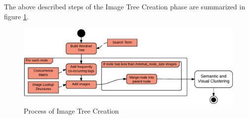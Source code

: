 The above described steps of the Image Tree Creation phase are summarized in figure \ref{fig_imagetreecreation}.

\begin{figure}[h]
\centering
\includegraphics[width=\textwidth]{images/image_tree_creation.pdf}
\caption{Process of Image Tree Creation}
\label{fig_imagetreecreation}
\end{figure}